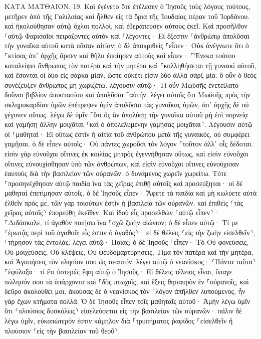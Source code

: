 \documentclass[twoside, 9pt]{extreport}
\begin{document}
ΚΑΤΑ ΜΑΤΘΑΙΟΝ.
19.
Καὶ ἐγένετο ὅτε ἐτέλεσεν ὁ Ἰησοῦς τοὺς λόγους τούτους, μετῆρεν ἀπὸ τῆς Γαλιλαίας καὶ ἦλθεν εἰς τὰ ὅρια τῆς Ἰουδαίας πέραν τοῦ Ἰορδάνου. 
καὶ ἠκολούθησαν αὐτῷ ὄχλοι πολλοί, καὶ ἐθεράπευσεν αὐτοὺς ἐκεῖ. 
Καὶ προσῆλθον ⸀αὐτῷ Φαρισαῖοι πειράζοντες αὐτὸν καὶ ⸀λέγοντες· Εἰ ἔξεστιν ⸀ἀνθρώπῳ ἀπολῦσαι τὴν γυναῖκα αὐτοῦ κατὰ πᾶσαν αἰτίαν; 
ὁ δὲ ἀποκριθεὶς ⸀εἶπεν· Οὐκ ἀνέγνωτε ὅτι ὁ ⸀κτίσας ἀπ᾽ ἀρχῆς ἄρσεν καὶ θῆλυ ἐποίησεν αὐτοὺς 
καὶ εἶπεν· ⸀Ἕνεκα τούτου καταλείψει ἄνθρωπος τὸν πατέρα καὶ τὴν μητέρα καὶ ⸀κολληθήσεται τῇ γυναικὶ αὐτοῦ, καὶ ἔσονται οἱ δύο εἰς σάρκα μίαν; 
ὥστε οὐκέτι εἰσὶν δύο ἀλλὰ σὰρξ μία. ὃ οὖν ὁ θεὸς συνέζευξεν ἄνθρωπος μὴ χωριζέτω. 
λέγουσιν αὐτῷ· Τί οὖν Μωϋσῆς ἐνετείλατο δοῦναι βιβλίον ἀποστασίου καὶ ἀπολῦσαι ⸀αὐτήν. 
λέγει αὐτοῖς ὅτι Μωϋσῆς πρὸς τὴν σκληροκαρδίαν ὑμῶν ἐπέτρεψεν ὑμῖν ἀπολῦσαι τὰς γυναῖκας ὑμῶν, ἀπ᾽ ἀρχῆς δὲ οὐ γέγονεν οὕτως. 
λέγω δὲ ὑμῖν ⸀ὅτι ὃς ἂν ἀπολύσῃ τὴν γυναῖκα αὐτοῦ μὴ ἐπὶ πορνείᾳ καὶ γαμήσῃ ἄλλην μοιχᾶται ⸂καὶ ὁ ἀπολελυμένην γαμήσας μοιχᾶται⸃. 
Λέγουσιν αὐτῷ οἱ ⸀μαθηταί· Εἰ οὕτως ἐστὶν ἡ αἰτία τοῦ ἀνθρώπου μετὰ τῆς γυναικός, οὐ συμφέρει γαμῆσαι. 
ὁ δὲ εἶπεν αὐτοῖς· Οὐ πάντες χωροῦσι τὸν λόγον ⸀τοῦτον ἀλλ᾽ οἷς δέδοται. 
εἰσὶν γὰρ εὐνοῦχοι οἵτινες ἐκ κοιλίας μητρὸς ἐγεννήθησαν οὕτως, καὶ εἰσὶν εὐνοῦχοι οἵτινες εὐνουχίσθησαν ὑπὸ τῶν ἀνθρώπων, καὶ εἰσὶν εὐνοῦχοι οἵτινες εὐνούχισαν ἑαυτοὺς διὰ τὴν βασιλείαν τῶν οὐρανῶν. ὁ δυνάμενος χωρεῖν χωρείτω. 
Τότε ⸀προσηνέχθησαν αὐτῷ παιδία ἵνα τὰς χεῖρας ἐπιθῇ αὐτοῖς καὶ προσεύξηται· οἱ δὲ μαθηταὶ ἐπετίμησαν αὐτοῖς. 
ὁ δὲ Ἰησοῦς εἶπεν· Ἄφετε τὰ παιδία καὶ μὴ κωλύετε αὐτὰ ἐλθεῖν πρός με, τῶν γὰρ τοιούτων ἐστὶν ἡ βασιλεία τῶν οὐρανῶν. 
καὶ ἐπιθεὶς ⸂τὰς χεῖρας αὐτοῖς⸃ ἐπορεύθη ἐκεῖθεν. 
Καὶ ἰδοὺ εἷς προσελθὼν ⸂αὐτῷ εἶπεν⸃· ⸀Διδάσκαλε, τί ἀγαθὸν ποιήσω ἵνα ⸀σχῶ ζωὴν αἰώνιον; 
ὁ δὲ εἶπεν αὐτῷ· Τί με ⸂ἐρωτᾷς περὶ τοῦ ἀγαθοῦ; εἷς ἐστιν ὁ ἀγαθός⸃· εἰ δὲ θέλεις ⸂εἰς τὴν ζωὴν εἰσελθεῖν⸃, ⸀τήρησον τὰς ἐντολάς. 
λέγει αὐτῷ· Ποίας; ὁ δὲ Ἰησοῦς ⸀εἶπεν· Τὸ Οὐ φονεύσεις, Οὐ μοιχεύσεις, Οὐ κλέψεις, Οὐ ψευδομαρτυρήσεις, 
Τίμα τὸν πατέρα καὶ τὴν μητέρα, καὶ Ἀγαπήσεις τὸν πλησίον σου ὡς σεαυτόν. 
λέγει αὐτῷ ὁ νεανίσκος· ⸂Πάντα ταῦτα⸃ ⸀ἐφύλαξα· τί ἔτι ὑστερῶ; 
ἔφη αὐτῷ ὁ Ἰησοῦς· Εἰ θέλεις τέλειος εἶναι, ὕπαγε πώλησόν σου τὰ ὑπάρχοντα καὶ ⸀δὸς πτωχοῖς, καὶ ἕξεις θησαυρὸν ἐν ⸀οὐρανοῖς, καὶ δεῦρο ἀκολούθει μοι. 
ἀκούσας δὲ ὁ νεανίσκος τὸν ⸀λόγον ἀπῆλθεν λυπούμενος, ἦν γὰρ ἔχων κτήματα πολλά. 
Ὁ δὲ Ἰησοῦς εἶπεν τοῖς μαθηταῖς αὐτοῦ· Ἀμὴν λέγω ὑμῖν ὅτι ⸂πλούσιος δυσκόλως⸃ εἰσελεύσεται εἰς τὴν βασιλείαν τῶν οὐρανῶν· 
πάλιν δὲ λέγω ὑμῖν, εὐκοπώτερόν ἐστιν κάμηλον διὰ ⸀τρυπήματος ῥαφίδος ⸀εἰσελθεῖν ἢ πλούσιον ⸂εἰς τὴν βασιλείαν τοῦ θεοῦ⸃. 
\end{document}
